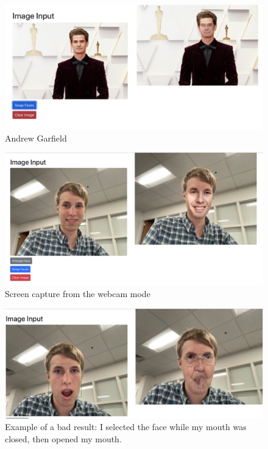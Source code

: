 \begin{figure}[t]
    \centering
    \includegraphics[width=\linewidth]{andrew_garfield_result.png}
    \caption{Andrew Garfield}
    \label{fig:result4}
\end{figure}

\begin{figure}[t]
    \centering
    \includegraphics[width=\linewidth]{Screenshot_2022-05-09 16.14.04.png}
    \caption{Screen capture from the webcam mode}
    \label{fig:result5}
\end{figure}

\begin{figure}[t]
    \centering
    \includegraphics[width=\linewidth]{Screenshot_2022-05-09 16.29.35.png}
    \caption{Example of a bad result: I selected the face while my mouth was closed, then opened my mouth.}
    \label{fig:result6}
\end{figure}

